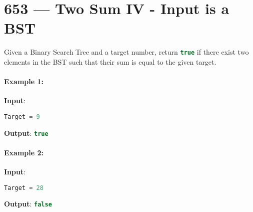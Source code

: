 \section{653 --- Two Sum IV - Input is a BST}
Given a Binary Search Tree and a target number, return \lstinline[language=C++, basicstyle=\small\ttfamily, keywordstyle=\bfseries\color{green!40!black}]|true| if there exist two elements in the BST such that their sum is equal to the given target.

\paragraph{Example 1:}

\begin{flushleft}
\textbf{Input}: 
\begin{figure}[H]
\end{figure}

\lstinline[language=C++, basicstyle=\small\ttfamily, keywordstyle=\bfseries\color{green!40!black}]|Target = 9|

\textbf{Output}: \lstinline[language=C++, basicstyle=\small\ttfamily, keywordstyle=\bfseries\color{green!40!black}]|true|
\end{flushleft}

 

\paragraph{Example 2:}

\textbf{Input}: 
\begin{figure}[H]
\end{figure}

\lstinline[language=C++, basicstyle=\small\ttfamily, keywordstyle=\bfseries\color{green!40!black}]|Target = 28|

\textbf{Output}: \lstinline[language=C++, basicstyle=\small\ttfamily, keywordstyle=\bfseries\color{green!40!black}]|false|

